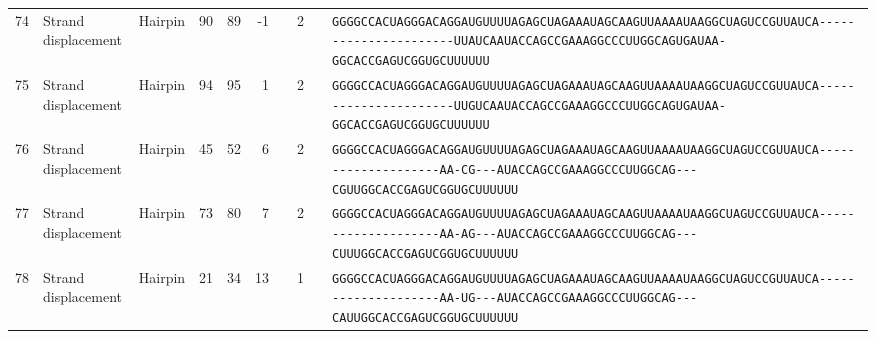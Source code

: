 \begin{tabular}{rllrrrrrcl}
 74 & Strand displacement & Hairpin & 90 & 89 & -1 &   & 2 &  &
 \color{ucsfdarkgrey}\verb|GGGGCCACUAGGGACAGGAU|\color{ucsforange}\verb|GUUUUA|\color{ucsfblue}\verb|GAGCUAGAAAUAGCAAGU|\color{ucsforange}\verb|UAAAAUAA|\color{ucsfnavy}\verb|GGCUAGUCCGU|\color{ucsforange}\verb|UAUCA|\color{ucsfteal}\verb|----------------------UUAUCA|\color{ucsfpurple}\verb|AUACCAGCCGAAAGGCCCUUGGCAG|\color{ucsfteal}\verb|UGAUAA-|\color{ucsforange}\verb|GGCACCGAGUCGGUGCUUUUUU| \\

 75 & Strand displacement & Hairpin & 94 & 95 & 1 &   & 2 &  &
 \color{ucsfdarkgrey}\verb|GGGGCCACUAGGGACAGGAU|\color{ucsforange}\verb|GUUUUA|\color{ucsfblue}\verb|GAGCUAGAAAUAGCAAGU|\color{ucsforange}\verb|UAAAAUAA|\color{ucsfnavy}\verb|GGCUAGUCCGU|\color{ucsforange}\verb|UAUCA|\color{ucsfteal}\verb|----------------------UUGUCA|\color{ucsfpurple}\verb|AUACCAGCCGAAAGGCCCUUGGCAG|\color{ucsfteal}\verb|UGAUAA-|\color{ucsforange}\verb|GGCACCGAGUCGGUGCUUUUUU| \\

 76 & Strand displacement & Hairpin & 45 & 52 & 6 &   & 2 &  &
 \color{ucsfdarkgrey}\verb|GGGGCCACUAGGGACAGGAU|\color{ucsforange}\verb|GUUUUA|\color{ucsfblue}\verb|GAGCUAGAAAUAGCAAGU|\color{ucsforange}\verb|UAAAAUAA|\color{ucsfnavy}\verb|GGCUAGUCCGU|\color{ucsforange}\verb|UAUCA|\color{ucsfteal}\verb|--------------------AA-CG---|\color{ucsfpurple}\verb|AUACCAGCCGAAAGGCCCUUGGCAG|\color{ucsfteal}\verb|---CGUU|\color{ucsforange}\verb|GGCACCGAGUCGGUGCUUUUUU| \\

 77 & Strand displacement & Hairpin & 73 & 80 & 7 &   & 2 &  &
 \color{ucsfdarkgrey}\verb|GGGGCCACUAGGGACAGGAU|\color{ucsforange}\verb|GUUUUA|\color{ucsfblue}\verb|GAGCUAGAAAUAGCAAGU|\color{ucsforange}\verb|UAAAAUAA|\color{ucsfnavy}\verb|GGCUAGUCCGU|\color{ucsforange}\verb|UAUCA|\color{ucsfteal}\verb|--------------------AA-AG---|\color{ucsfpurple}\verb|AUACCAGCCGAAAGGCCCUUGGCAG|\color{ucsfteal}\verb|---CUUU|\color{ucsforange}\verb|GGCACCGAGUCGGUGCUUUUUU| \\

 78 & Strand displacement & Hairpin & 21 & 34 & 13 &  & 1 &  &
 \color{ucsfdarkgrey}\verb|GGGGCCACUAGGGACAGGAU|\color{ucsforange}\verb|GUUUUA|\color{ucsfblue}\verb|GAGCUAGAAAUAGCAAGU|\color{ucsforange}\verb|UAAAAUAA|\color{ucsfnavy}\verb|GGCUAGUCCGU|\color{ucsforange}\verb|UAUCA|\color{ucsfteal}\verb|--------------------AA-UG---|\color{ucsfpurple}\verb|AUACCAGCCGAAAGGCCCUUGGCAG|\color{ucsfteal}\verb|---CAUU|\color{ucsforange}\verb|GGCACCGAGUCGGUGCUUUUUU| \\


\end{tabular}
